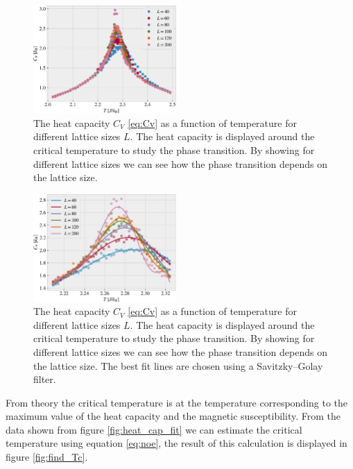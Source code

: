 \documentclass[%
 reprint,
nofootinbib,
aps,
]{revtex4-1}
\begin{document}
\begin{figure}
  \centering
  \includegraphics[width=0.485\textwidth]{../figures/heatcap.pdf}
  \caption{The heat capacity $C_V$ \eqref{eq:Cv} as a function of temperature for different lattice sizes $L$. The heat capacity is displayed around the critical temperature to study the phase transition. By showing for different lattice sizes we can see how the phase transition depends on the lattice size.}
  \label{fig:heat_cap}
\end{figure}

\begin{figure}
  \centering
  \includegraphics[width=0.485\textwidth]{../figures/fitted_suscept.pdf}
  \caption{The heat capacity $C_V$ \eqref{eq:Cv} as a function of temperature for different lattice sizes $L$. The heat capacity is displayed around the critical temperature to study the phase transition. By showing for different lattice sizes we can see how the phase transition depends on the lattice size. The best fit lines are chosen using a Savitzky–Golay filter.}
  \label{fig:heat_cap_fit}
\end{figure}

From theory the critical temperature is at the temperature corresponding to the maximum value of the heat capacity and the magnetic susceptibility. From the data shown from figure \vref{fig:heat_cap_fit} we can estimate the critical temperature using equation \eqref{eq:noe}, the result of this calculation is displayed in figure \vref{fig:find_Tc}.
\end{document}
